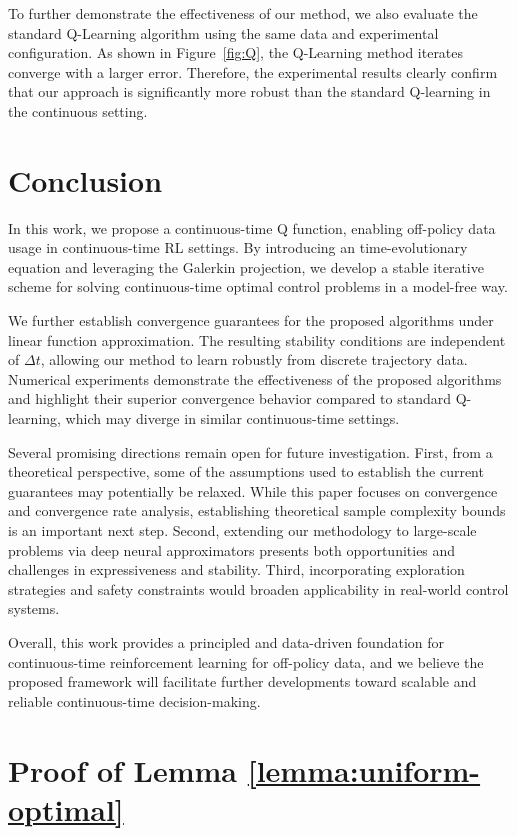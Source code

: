\documentclass[12pt]{article}
\def\dt{{\Delta t}}
\begin{document}
To further demonstrate the effectiveness of our method, we also evaluate the standard Q-Learning algorithm using the same data and experimental configuration. As shown in Figure~\ref{fig:Q}, the Q-Learning method iterates converge with a larger error. Therefore, the experimental results clearly confirm that our approach is significantly more robust than the standard Q-learning in the continuous setting.
     
\section{Conclusion}
In this work, we propose a continuous-time Q function, enabling off-policy data usage in continuous-time RL settings. By introducing an time-evolutionary equation and leveraging the Galerkin projection, we develop a stable iterative scheme for solving continuous-time optimal control problems in a model-free way. 

We further establish convergence guarantees for the proposed algorithms under linear function approximation. The resulting stability conditions are independent of $\dt$, allowing our method to learn robustly from discrete trajectory data. Numerical experiments demonstrate the effectiveness of the proposed algorithms and highlight their superior convergence behavior compared to standard Q-learning, which may diverge in similar continuous-time settings.

Several promising directions remain open for future investigation. First, from a theoretical perspective, some of the assumptions used to establish the current guarantees may potentially be relaxed. While this paper focuses on convergence and convergence rate analysis, establishing theoretical sample complexity bounds is an important next step. Second, extending our methodology to large-scale problems via deep neural approximators presents both opportunities and challenges in expressiveness and stability. Third, incorporating exploration strategies and safety constraints would broaden applicability in real-world control systems. 

Overall, this work provides a principled and data-driven foundation for continuous-time reinforcement learning for off-policy data, and we believe the proposed framework will facilitate further developments toward scalable and reliable continuous-time decision-making.


\appendix
\section{Proof of Lemma \ref{lemma:uniform-optimal}}\label{sec:proof of uniform-optimal}
\end{document}
